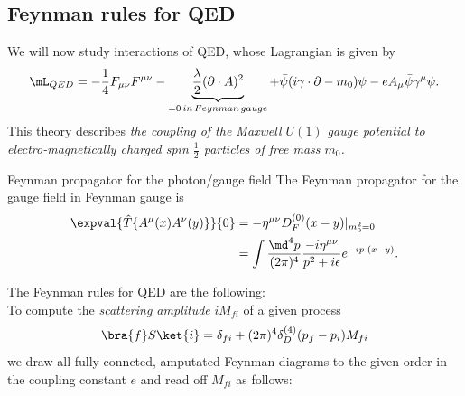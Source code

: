 \subsection{Feynman rules for QED}
We will now study interactions of QED, whose Lagrangian is given by
\begin{equation}
	\mL_{QED} = -\frac{1}{4} F_{\mu \nu} F^{\mu \nu} - \underbrace{\frac{\lambda}{2} (\partial \cdot A)^2}_{=0 \, in \, Feynman \, gauge} + \bar{\psi} (i \gamma\cdot \partial -m_0) \psi - e A_{\mu} \bar{\psi} \gamma^{\mu} \psi.
\end{equation}
This theory describes \emph{the coupling of the Maxwell $U(1)$ gauge potential to electro-magnetically charged spin $\frac{1}{2}$ particles of free mass $m_0$.}
\begin{mybox}{Feynman propagator for the photon/gauge field}
	The Feynman propagator for the gauge field in Feynman gauge is
\begin{align}
	\expval{\hat{T}\{A^{\mu} (x) A^{\nu}(y) \}}{0} &= - \eta^{\mu \nu} D^{(0)}_F(x-y) |_{m^2_0=0}\nonumber \\
	& = \int \frac{\md^4 p}{(2 \pi)^4} \frac{- i \eta^{\mu \nu}}{p^2 +i \epsilon} e^{-i p\cdot (x-y)}.
\end{align}
\end{mybox}
\vspace{1cm}
		The Feynman rules for QED are the following:\\
	To compute the \emph{scattering amplitude} $i M_{fi}$ of a given process
	\begin{equation}
	\bra{f}S\ket{i} = \delta_{fi} + (2 \pi)^4 \delta^{(4)}_D(p_f-p_i) M_{fi}
	\end{equation}
	we draw all fully conncted, amputated Feynman diagrams to the given order in the coupling constant $e$ and read off $M_{fi}$ as follows:
